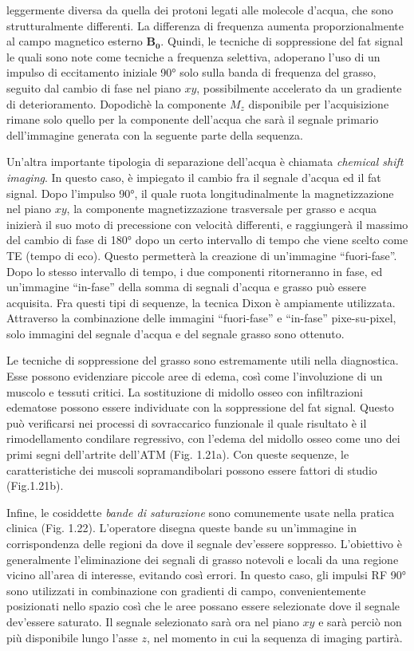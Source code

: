 \documentclass[leqno,10pt,twocolumn,a4paper]{article}
\begin{document}
	leggermente diversa da quella dei protoni legati alle molecole d'acqua, che sono strutturalmente differenti. La differenza di frequenza aumenta proporzionalmente al campo magnetico
	esterno $\boldsymbol{B_0}$. Quindi, le tecniche di soppressione del fat signal le quali sono note come tecniche a frequenza selettiva, adoperano l'uso di un impulso di eccitamento iniziale 90°
	solo sulla banda di frequenza del grasso, seguito dal cambio di fase nel piano $xy$, possibilmente accelerato da un gradiente di deterioramento. Dopodichè la componente $M_z$ disponibile
	per l'acquisizione rimane solo quello per la componente dell'acqua che sarà il segnale primario dell'immagine generata con la seguente parte della sequenza. \par Un'altra importante tipologia 
	di separazione dell'acqua è chiamata \textit{chemical shift imaging}. In questo caso, è impiegato il cambio fra il segnale d'acqua ed il fat signal. Dopo l'impulso 90°, il quale ruota
	longitudinalmente la magnetizzazione nel piano $xy$, la componente magnetizzazione trasversale per grasso e acqua inizierà il suo moto di precessione con velocità differenti, e raggiungerà
	il massimo del cambio di fase di 180° dopo un certo intervallo di tempo che viene scelto come TE (tempo di eco). Questo permetterà la creazione di un'immagine ``fuori-fase''. Dopo lo stesso
	intervallo di tempo, i due componenti ritorneranno in fase, ed un'immagine ``in-fase'' della somma di segnali d'acqua e grasso può essere acquisita. Fra questi tipi di sequenze, la tecnica Dixon
	è ampiamente utilizzata. Attraverso la combinazione delle immagini ``fuori-fase'' e ``in-fase'' pixe-su-pixel, solo immagini del segnale d'acqua e del segnale grasso sono ottenuto.
	\par Le tecniche di soppressione del grasso sono estremamente utili nella diagnostica. Esse possono evidenziare piccole aree di edema, così come l'involuzione di un muscolo e tessuti critici.
	La sostituzione di midollo osseo con infiltrazioni edematose possono essere individuate con la soppressione del fat signal. Questo può verificarsi nei processi di sovraccarico funzionale il quale 
	risultato è il rimodellamento condilare regressivo, con l'edema del midollo osseo come uno dei primi segni dell'artrite dell'ATM (Fig. 1.21a). Con queste sequenze, le caratteristiche dei muscoli
	sopramandibolari possono essere fattori di studio (Fig.1.21b). \par Infine, le cosiddette \textit{bande di saturazione} sono comunemente usate nella pratica clinica (Fig. 1.22). L'operatore 
	disegna queste bande su un'immagine in corrispondenza delle regioni da dove il segnale dev'essere soppresso. L'obiettivo è generalmente l'eliminazione dei segnali di grasso notevoli e locali
	da una regione vicino all'area di interesse, evitando così errori. In questo caso, gli impulsi RF 90° sono utilizzati in combinazione con gradienti di campo, convenientemente posizionati nello 
	spazio così che le aree possano essere selezionate dove il segnale dev'essere saturato. Il segnale selezionato sarà ora nel piano $xy$ e sarà perciò non più disponibile lungo l'asse $z$, nel
	momento in cui la sequenza di imaging partirà.
\end{document}
